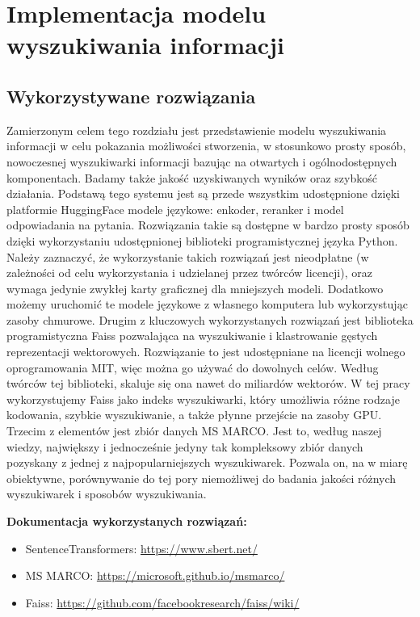 \chapter{Implementacja modelu wyszukiwania informacji}
\label{chap:czwarty}

\section{Wykorzystywane rozwiązania}

Zamierzonym celem tego rozdziału jest przedstawienie modelu wyszukiwania informacji w celu pokazania możliwości stworzenia, w stosunkowo prosty sposób, nowoczesnej wyszukiwarki informacji bazując na otwartych i ogólnodostępnych komponentach. Badamy także jakość uzyskiwanych wyników oraz szybkość działania. Podstawą tego systemu jest są przede wszystkim udostępnione dzięki platformie HuggingFace modele językowe: enkoder, reranker i model odpowiadania na pytania. Rozwiązania takie są dostępne w bardzo prosty sposób dzięki wykorzystaniu udostępnionej biblioteki programistycznej języka Python. Należy zaznaczyć, że wykorzystanie takich rozwiązań jest nieodpłatne (w zależności od celu wykorzystania i udzielanej przez twórców licencji), oraz wymaga jedynie zwykłej karty graficznej dla mniejszych modeli. Dodatkowo możemy uruchomić te modele językowe z własnego komputera lub wykorzystując zasoby chmurowe. Drugim z kluczowych wykorzystanych rozwiązań jest biblioteka programistyczna Faiss pozwalająca na wyszukiwanie i klastrowanie gęstych reprezentacji wektorowych. Rozwiązanie to jest udostępniane na licencji wolnego oprogramowania MIT, więc można go używać do dowolnych celów. Według twórców tej biblioteki, skaluje się ona nawet do miliardów wektorów. W tej pracy wykorzystujemy Faiss jako indeks wyszukiwarki, który umożliwia różne rodzaje kodowania, szybkie wyszukiwanie, a także płynne przejście na zasoby GPU. Trzecim z elementów jest zbiór danych MS MARCO. Jest to, według naszej wiedzy, największy i jednocześnie jedyny tak kompleksowy zbiór danych pozyskany z jednej z najpopularniejszych wyszukiwarek. Pozwala on, na w miarę obiektywne, porównywanie do tej pory niemożliwej do badania jakości różnych wyszukiwarek i sposobów wyszukiwania.\newline

\textbf{Dokumentacja wykorzystanych rozwiązań:}
\begin{itemize}
\itemsep0em 
\item SentenceTransformers: \url{https://www.sbert.net/}\newline
\item MS MARCO: \url{https://microsoft.github.io/msmarco/}\newline
\item Faiss: \url{https://github.com/facebookresearch/faiss/wiki/}\newline
\end{itemize}

